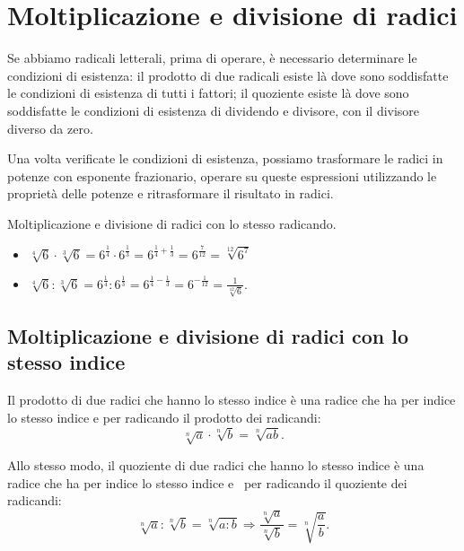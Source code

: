 
\section{Moltiplicazione e divisione di radici}
\label{sec:radici_moltiplicazione}

Se abbiamo radicali letterali, prima di operare, è necessario determinare le 
condizioni di esistenza: il prodotto di due radicali esiste là dove sono 
soddisfatte le condizioni di esistenza di tutti i fattori; 
il quoziente esiste là dove sono soddisfatte le condizioni di esistenza di 
dividendo e divisore, con il divisore diverso da zero.

Una volta verificate le condizioni di esistenza, possiamo trasformare le
radici in potenze con esponente frazionario, operare su queste espressioni 
utilizzando le proprietà delle potenze e ritrasformare il risultato in radici.

\begin{exrig}
 \begin{esempio}
Moltiplicazione e divisione di radici con lo stesso radicando.
\begin{itemize}
\item $\sqrt[4]6\cdot \sqrt[3]6=6^{\frac 1 4}\cdot 6^{\frac 1 3}=
       6^{\frac 1 4+\frac 1 3}=6^{\frac 7{12}}=\sqrt[12]{6^7}$
\item $\sqrt[4]6:\sqrt[3]6=6^{\frac 1 4}:6^{\frac 1 3}=
       6^{\frac 1 4-\frac 1 3}=6^{-\frac 1{12}}=\frac 1{\sqrt[12]6}$.
\end{itemize}
 \end{esempio}
\end{exrig}

\subsection{Moltiplicazione e divisione di radici con lo stesso indice}
Il prodotto di due radici che hanno lo stesso indice è una radice che ha per 
indice lo stesso indice e per radicando il prodotto dei radicandi:
\[\sqrt[n]a\cdot \sqrt[n]b=\sqrt[n]{ab}.\]

Allo stesso modo, il quoziente di due radici che hanno lo stesso indice è una 
radice che ha per indice lo stesso indice e \ per radicando il quoziente dei 
radicandi:
\[\sqrt[n]a:\sqrt[n]b=\sqrt[n]{a:b} \Rightarrow \dfrac{\sqrt[n]a}{\sqrt[n]b}=
  \sqrt[n]{\dfrac a b}.\]

